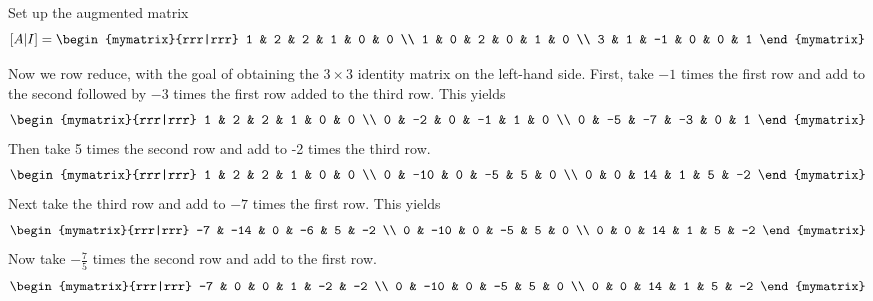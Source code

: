\begin{solution} Set up the augmented matrix
  \begin{equation*}
    \mat{A|I} =  
    \begin{mymatrix}{rrr|rrr}
      1 & 2 & 2 & 1 & 0 & 0 \\
      1 & 0 & 2 & 0 & 1 & 0 \\
      3 & 1 & -1 & 0 & 0 & 1
    \end{mymatrix}
  \end{equation*}

  Now we row reduce, with the goal of obtaining the $3 \times 3$ identity matrix on the left-hand side.
  First, take $-1 $ times the first row and add to the second
  followed by $-3 $ times the first row added to the third row. This
  yields
  \begin{equation*}
    \allowbreak \begin{mymatrix}{rrr|rrr}
      1 & 2 & 2 & 1 & 0 & 0 \\
      0 & -2 & 0 & -1 & 1 & 0 \\
      0 & -5 & -7 & -3 & 0 & 1
    \end{mymatrix} 
  \end{equation*}
  Then take 5 times the second row and add to -2 times the third row.
  \begin{equation*}
    \begin{mymatrix}{rrr|rrr}
      1 & 2 & 2 & 1 & 0 & 0 \\
      0 & -10 & 0 & -5 & 5 & 0 \\
      0 & 0 & 14 & 1 & 5 & -2
    \end{mymatrix}
  \end{equation*}
  Next take the third row and add to $ -7$ times the first row.
  This yields
  \begin{equation*}
    \begin{mymatrix}{rrr|rrr}
      -7 & -14 & 0 & -6 & 5 & -2 \\
      0 & -10 & 0 & -5 & 5 & 0 \\
      0 & 0 & 14 & 1 & 5 & -2
    \end{mymatrix} 
  \end{equation*}
  Now take $ -\frac{7}{5}$ times the second row and add to the first row.
  \begin{equation*}
    \begin{mymatrix}{rrr|rrr}
      -7 & 0 & 0 & 1 & -2 & -2 \\
      0 & -10 & 0 & -5 & 5 & 0 \\
      0 & 0 & 14 & 1 & 5 & -2

\end{mymatrix}
\end{equation*}
\end{solution}
